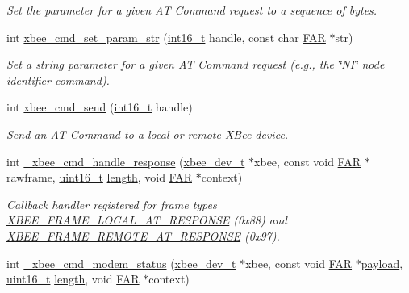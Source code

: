 \begin{DoxyCompactItemize}
\begin{DoxyCompactList}\small\item\em Set the parameter for a given AT Command request to a sequence of bytes. \end{DoxyCompactList}\item 
int \hyperlink{group__xbee__atcmd_ga5b69459e7c47be384c9add2921e507e0}{xbee\+\_\+cmd\+\_\+set\+\_\+param\+\_\+str} (\hyperlink{group__hal__dos_ga2140805d08462d474b82ddc8d1c2f3e6}{int16\+\_\+t} handle, const char \hyperlink{group__hal_gaef060b3456fdcc093a7210a762d5f2ed}{F\+AR} $\ast$str)
\begin{DoxyCompactList}\small\item\em Set a string parameter for a given AT Command request (e.\+g., the \char`\"{}\+N\+I\char`\"{} node identifier command). \end{DoxyCompactList}\item 
int \hyperlink{group__xbee__atcmd_ga2c58eedef60b41dd30ae1f6b475606a8}{xbee\+\_\+cmd\+\_\+send} (\hyperlink{group__hal__dos_ga2140805d08462d474b82ddc8d1c2f3e6}{int16\+\_\+t} handle)
\begin{DoxyCompactList}\small\item\em Send an AT Command to a local or remote X\+Bee device. \end{DoxyCompactList}\item 
int \hyperlink{group__xbee__atcmd_ga3b4559f4e729b1c96f5c0d9e4476aa7d}{\+\_\+xbee\+\_\+cmd\+\_\+handle\+\_\+response} (\hyperlink{structxbee__dev__t}{xbee\+\_\+dev\+\_\+t} $\ast$xbee, const void \hyperlink{group__hal_gaef060b3456fdcc093a7210a762d5f2ed}{F\+AR} $\ast$rawframe, \hyperlink{group__hal__dos_ga5a8b2dc9e45a9ee81a94ef304fb62505}{uint16\+\_\+t} \hyperlink{group__zdo_gab2b3adeb2a67e656ff030b56727fd0ac}{length}, void \hyperlink{group__hal_gaef060b3456fdcc093a7210a762d5f2ed}{F\+AR} $\ast$context)
\begin{DoxyCompactList}\small\item\em Callback handler registered for frame types \hyperlink{group__xbee__device_gga7753bbebaf00d6d64942f64b6ae9b7b9ae66771334070219cd098c8201936cf4a}{X\+B\+E\+E\+\_\+\+F\+R\+A\+M\+E\+\_\+\+L\+O\+C\+A\+L\+\_\+\+A\+T\+\_\+\+R\+E\+S\+P\+O\+N\+SE} (0x88) and \hyperlink{group__xbee__device_gga7753bbebaf00d6d64942f64b6ae9b7b9a3cd726459592fab4cdc9b5e6bbecb79f}{X\+B\+E\+E\+\_\+\+F\+R\+A\+M\+E\+\_\+\+R\+E\+M\+O\+T\+E\+\_\+\+A\+T\+\_\+\+R\+E\+S\+P\+O\+N\+SE} (0x97). \end{DoxyCompactList}\item 
int \hyperlink{group__xbee__atcmd_ga9b0ddf7aae7599dc334304f2b642f05f}{\+\_\+xbee\+\_\+cmd\+\_\+modem\+\_\+status} (\hyperlink{structxbee__dev__t}{xbee\+\_\+dev\+\_\+t} $\ast$xbee, const void \hyperlink{group__hal_gaef060b3456fdcc093a7210a762d5f2ed}{F\+AR} $\ast$\hyperlink{group__zcl_gacb1403989580c30b5cac60f347c5d6ab}{payload}, \hyperlink{group__hal__dos_ga5a8b2dc9e45a9ee81a94ef304fb62505}{uint16\+\_\+t} \hyperlink{group__zdo_gab2b3adeb2a67e656ff030b56727fd0ac}{length}, void \hyperlink{group__hal_gaef060b3456fdcc093a7210a762d5f2ed}{F\+AR} $\ast$context)

\end{DoxyCompactItemize}
